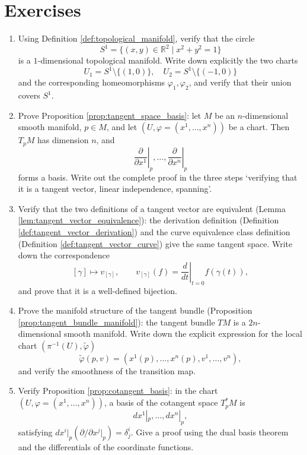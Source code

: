 \section*{Exercises}

\begin{enumerate}[leftmargin=3em, label=\textbf{Exercise \arabic*}]
    \item Using Definition \ref{def:topological_manifold}, verify that the circle
    \[
    S^1=\{(x,y)\in\mathbb{R}^2\mid x^2+y^2=1\}
    \]
    is a $1$-dimensional topological manifold. Write down explicitly the two charts
    \[
    U_1=S^1\setminus\{(1,0)\},\quad U_2=S^1\setminus\{(-1,0)\}
    \]
    and the corresponding homeomorphisms $\varphi_1,\varphi_2$, and verify that their union covers $S^1$.

    \item Prove Proposition \ref{prop:tangent_space_basis}:
    let $M$ be an $n$-dimensional smooth manifold, $p\in M$, and let $(U,\varphi=(x^1,\dots,x^n))$ be a chart.
    Then $T_pM$ has dimension $n$, and
    \[
    \left.\frac{\partial}{\partial x^1}\right|_p,\dots,
    \left.\frac{\partial}{\partial x^n}\right|_p
    \]
    forms a basis. Write out the complete proof in the three steps `verifying that it is a tangent vector, linear independence, spanning'.

    \item Verify that the two definitions of a tangent vector are equivalent (Lemma \ref{lem:tangent_vector_equivalence}):
    the derivation definition (Definition \ref{def:tangent_vector_derivation}) and the curve equivalence class definition
    (Definition \ref{def:tangent_vector_curve}) give the same tangent space.
    Write down the correspondence
    \[
    [\gamma]\mapsto v_{[\gamma]},\qquad
    v_{[\gamma]}(f)=\left.\frac{d}{dt}\right|_{t=0}f(\gamma(t)),
    \]
    and prove that it is a well-defined bijection.

    \item Prove the manifold structure of the tangent bundle (Proposition \ref{prop:tangent_bundle_manifold}):
    the tangent bundle $TM$ is a $2n$-dimensional smooth manifold.
    Write down the explicit expression for the local chart $(\pi^{-1}(U),\tilde{\varphi})$
    \[
    \tilde{\varphi}(p,v)=(x^1(p),\dots,x^n(p),v^1,\dots,v^n),
    \]
    and verify the smoothness of the transition map.

    \item Verify Proposition \ref{prop:cotangent_basis}:
    in the chart $(U,\varphi=(x^1,\dots,x^n))$, a basis of the cotangent space $T_p^*M$ is
    \[
    dx^1|_p,\dots,dx^n|_p,
    \]
    satisfying $dx^i|_p(\partial/\partial x^j|_p)=\delta_j^i$.
    Give a proof using the dual basis theorem and the differentials of the coordinate functions.


\end{enumerate}

